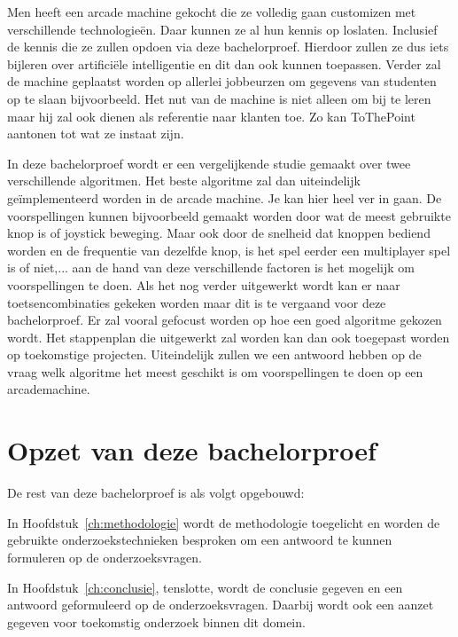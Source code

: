 Men heeft een arcade machine gekocht die ze volledig gaan customizen met verschillende technologieën. Daar kunnen ze al hun kennis op loslaten. Inclusief de kennis die ze zullen opdoen via deze bachelorproef. Hierdoor zullen ze dus iets bijleren over artificiële intelligentie en dit dan ook kunnen toepassen. Verder zal de machine geplaatst worden op allerlei jobbeurzen om gegevens van studenten op te slaan bijvoorbeeld. Het nut van de machine is niet alleen om bij te leren maar hij zal ook dienen als referentie naar klanten toe. Zo kan ToThePoint aantonen tot wat ze instaat zijn. 

In deze bachelorproef wordt er een vergelijkende studie gemaakt over twee verschillende algoritmen. Het beste algoritme zal dan uiteindelijk geïmplementeerd worden in de arcade machine. Je kan hier heel ver in gaan. De voorspellingen kunnen bijvoorbeeld gemaakt worden door wat de meest gebruikte knop is of joystick beweging. Maar ook door de snelheid dat knoppen bediend worden en de frequentie van dezelfde knop, is het spel eerder een multiplayer spel is of niet,...  aan de hand van deze verschillende factoren is het mogelijk om voorspellingen te doen. Als het nog verder uitgewerkt wordt kan er naar toetsencombinaties gekeken worden maar dit is te vergaand voor deze bachelorproef. Er zal vooral gefocust worden op hoe een goed algoritme gekozen wordt. Het stappenplan die uitgewerkt zal worden kan dan ook toegepast worden op toekomstige projecten. Uiteindelijk zullen we een antwoord hebben op de vraag welk algoritme het meest geschikt is om voorspellingen te doen op een arcademachine.



\section{Opzet van deze bachelorproef}
\label{sec:opzet-bachelorproef}


De rest van deze bachelorproef is als volgt opgebouwd:

In Hoofdstuk~\ref{ch:methodologie} wordt de methodologie toegelicht en worden de gebruikte onderzoekstechnieken besproken om een antwoord te kunnen formuleren op de onderzoeksvragen.


In Hoofdstuk~\ref{ch:conclusie}, tenslotte, wordt de conclusie gegeven en een antwoord geformuleerd op de onderzoeksvragen. Daarbij wordt ook een aanzet gegeven voor toekomstig onderzoek binnen dit domein.

